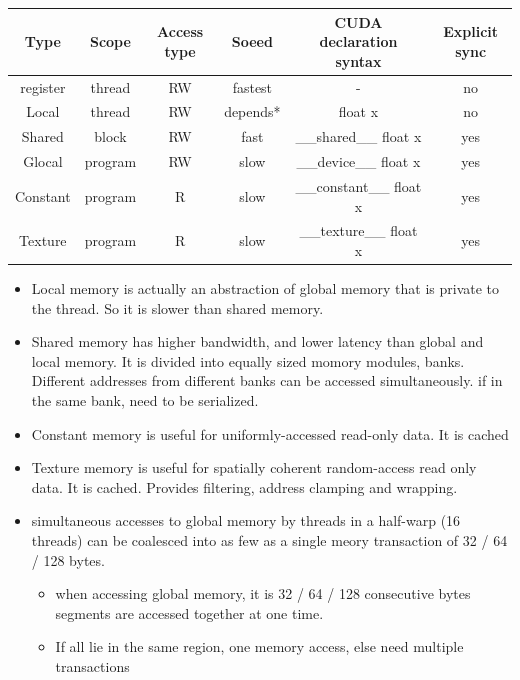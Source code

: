 \documentclass{article}
\begin{document}
\begin{center}
    \begin{tabular}{| c | c| c | c| c| c| }
        \hline
        Type     & Scope   & Access type & Soeed    & CUDA declaration syntax  & Explicit sync \\
        \hline
        \hline
        register & thread  & RW          & fastest  & -                        & no            \\
        \hline
        Local    & thread  & RW          & depends* & float x                  & no            \\
        \hline
        Shared   & block   & RW          & fast     & \_\_shared\_\_ float x   & yes           \\
        \hline
        Glocal   & program & RW          & slow     & \_\_device\_\_ float x   & yes           \\
        \hline
        Constant & program & R           & slow     & \_\_constant\_\_ float x & yes           \\
        \hline
        Texture  & program & R           & slow     & \_\_texture\_\_ float x  & yes           \\
        \hline
    \end{tabular}
\end{center}
\begin{itemize}
    \item Local memory is actually an abstraction of global memory that is private to the thread.  So it is slower than shared memory.
    \item Shared memory has higher bandwidth, and lower latency than global and local memory. It is divided into equally sized momory modules, banks. Different addresses from different banks can be accessed simultaneously. if in the same bank, need to be serialized.
    \item Constant memory is useful for uniformly-accessed read-only data. It is cached
    \item Texture memory is useful for spatially coherent random-access read only data. It is cached. Provides filtering, address clamping and wrapping.
    \item simultaneous accesses to global memory by threads in a half-warp (16 threads) can be coalesced into as few as a single meory transaction of 32 / 64 / 128 bytes.
          \begin{itemize}
              \item when accessing global memory, it is 32 / 64 / 128 consecutive bytes segments are accessed together at one time.
              \item If all lie in the same region, one memory access, else need multiple transactions
          \end{itemize}
\end{itemize}
\end{document}
